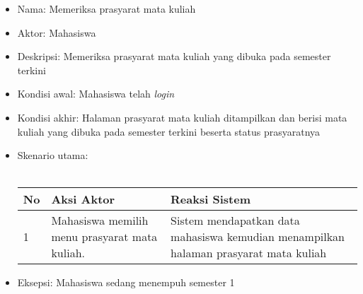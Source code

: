 \begin{enumerate}
\begin{itemize}
			\item Nama: Memeriksa prasyarat mata kuliah
			\item Aktor: Mahasiswa
			\item Deskripsi: Memeriksa prasyarat mata kuliah yang dibuka pada semester terkini
			\item Kondisi awal: Mahasiswa telah \textit{login}
			\item Kondisi akhir: Halaman prasyarat mata kuliah ditampilkan dan berisi mata kuliah yang dibuka pada semester terkini beserta status prasyaratnya
			\item Skenario utama: \\ \\
				\begin{tabular}{|p{0.5cm} |p{6cm}| p{6cm}|}
						\hline
							No 	& Aksi Aktor & Reaksi Sistem \\ \hline
							1 	& Mahasiswa memilih menu prasyarat mata kuliah. 	&	Sistem mendapatkan data mahasiswa kemudian menampilkan halaman prasyarat mata kuliah \\ \hline 
						\end{tabular} 
			\item Eksepsi: Mahasiswa sedang menempuh semester 1
			

\end{itemize}
\end{enumerate}
